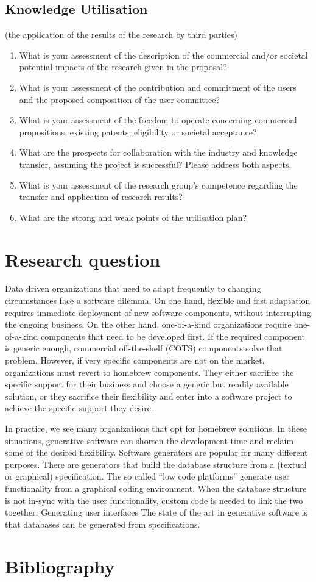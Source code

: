\documentclass{elsarticle}
\begin{document}
\subsection{Knowledge Utilisation} (the application of the results of the research by third parties)
\begin{enumerate}
   \item  	What is your assessment of the description of the commercial and/or societal potential impacts of the research given in the proposal?
   \item 	What is your assessment of the contribution and commitment of the users and the proposed composition of the user committee?
   \item 	What is your assessment of the freedom to operate concerning commercial propositions, existing patents, eligibility or societal acceptance? 
   \item 	What are the prospects for collaboration with the industry and knowledge transfer, assuming the project is successful? Please address both aspects.
   \item 	What is your assessment of the research group's competence regarding the transfer and application of research results?
   \item 	What are the strong and weak points of the utilisation plan?   
\end{enumerate}


\section{Research question}
   Data driven organizations that need to adapt frequently to changing circumstances face a software dilemma.
   On one hand, flexible and fast adaptation requires immediate deployment of new software components, without interrupting the ongoing business.
   On the other hand, one-of-a-kind organizations require one-of-a-kind components that need to be developed first.
   If the required component is generic enough, commercial off-the-shelf (COTS) components solve that problem.
   However, if very specific components are not on the market, organizations must revert to homebrew components.
   They either sacrifice the specific support for their business and choose a generic but readily available solution,
   or they sacrifice their flexibility and enter into a software project to achieve the specific support they desire.

   In practice, we see many organizations that opt for homebrew solutions.
   In these situations, generative software can shorten the development time and reclaim some of the desired flexibility.
   Software generators are popular for many different purposes.
   There are generators that build the database structure from a (textual or graphical) specification.
   The so called ``low code platforms'' generate user functionality from a graphical coding environment.
   When the database structure is not in-sync with the user functionality, custom code is needed to link the two together.
   Generating user interfaces
   The state of the art in generative software is that databases can be generated from specifications.
   
\label{sct:Introduction}
\section{Bibliography}


\end{document}
